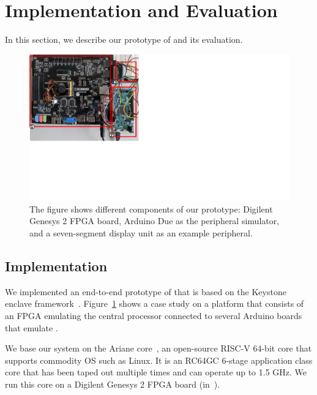 \section{Implementation and Evaluation}
\label{sec:eval}

In this section, we describe our prototype of \name and its evaluation.

\begin{figure}[t]
\centering
\includegraphics[trim={0 8cm 19cm 0}, clip, width=\linewidth]{chapters/PIE/images/prototype.pdf}
\caption[\name prototype]{The figure shows different components of our prototype: \one Digilent Genesys 2 FPGA board, \two Arduino Due as the peripheral simulator, and \three a seven-segment display unit as an example peripheral.} 
\label{fig:prototype}
\end{figure}

\subsection{Implementation}



We implemented an end-to-end prototype of \name that is based on the Keystone enclave framework~\cite{keystone}. Figure~\ref{fig:prototype} shows a case study on a platform that consists of an FPGA emulating the central processor connected to several Arduino boards that emulate \sphw. %

We base our system on the Ariane core~\cite{ariane}, an open-source RISC-V 64-bit core that supports commodity OS such as Linux. It is an RC64GC 6-stage application class core that has been taped out multiple times and can operate up to 1.5 GHz. We run this core on a Digilent Genesys 2 FPGA board (\one in~).

